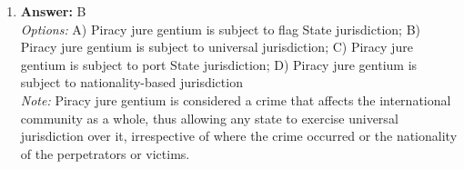 \documentclass[12pt]{article}
\begin{document}
\begin{enumerate}[label=\arabic*.]
\\ \textit{Note:} Standard-setting in human rights diplomacy involves establishing non-binding legal standards that guide states and organizations in promoting and protecting human rights, thereby facilitating international cooperation and accountability.
\item \textbf{Answer:} B
\\ \textit{Options:} A) Piracy jure gentium is subject to flag State jurisdiction; B) Piracy jure gentium is subject to universal jurisdiction; C) Piracy jure gentium is subject to port State jurisdiction; D) Piracy jure gentium is subject to nationality-based jurisdiction
\\ \textit{Note:} Piracy jure gentium is considered a crime that affects the international community as a whole, thus allowing any state to exercise universal jurisdiction over it, irrespective of where the crime occurred or the nationality of the perpetrators or victims.
\end{enumerate}
\end{document}
